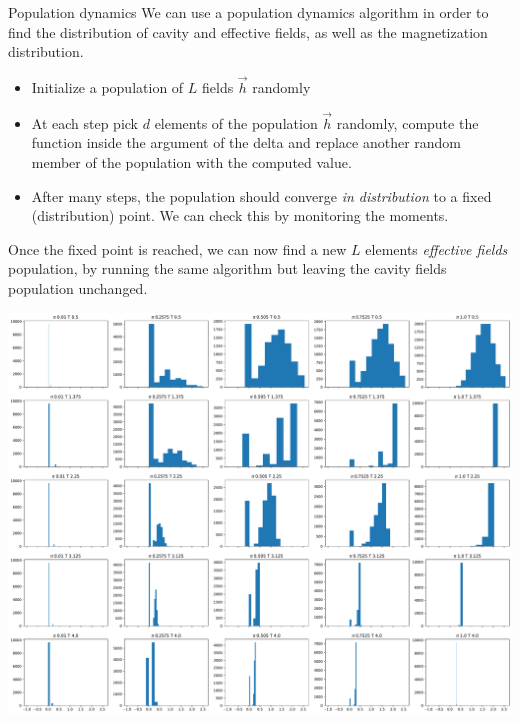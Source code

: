 \documentclass[handout]{beamer}
\begin{document}
\begin{frame}{Population dynamics}
    We can use a \alert{population dynamics} algorithm in order to find the
    distribution of cavity and effective fields, as well as the magnetization
    distribution.
    \begin{itemize}
        \item Initialize a population of $L$ fields $\vec h$ randomly
        \item At each step pick $d$ elements of the population $\vec h$
            randomly, compute the function inside the argument of the delta and
            replace another random member of the population with the computed
            value.
        \item After many steps, the population should converge \emph{in
            distribution} to a fixed (distribution) point. We can check this by
            monitoring the moments.
    \end{itemize}
    Once the fixed point is reached, we can now find a new $L$ elements
    \emph{effective fields} population, by running the same algorithm but
    leaving the cavity fields population unchanged.
\end{frame}

\begin{frame}[plain]
    \centering
    \includegraphics[width=.9\textwidth]{pd_cavity}
\end{frame}
\end{document}
